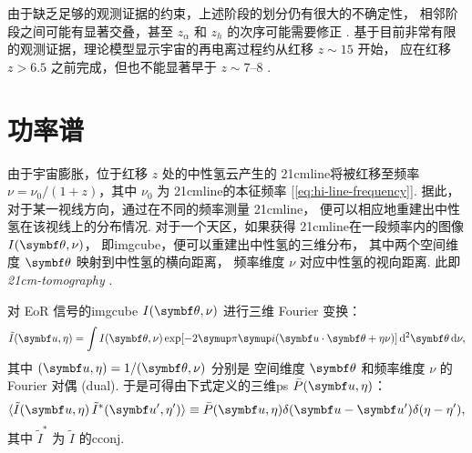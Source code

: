 由于缺乏足够的观测证据的约束，上述阶段的划分仍有很大的不确定性，
相邻阶段之间可能有显著交叠，甚至 $z_{\alpha}$ 和 $z_h$ 的次序可能需要修正
\cite{nusser2005,pritchard2012}.
基于目前非常有限的观测证据，理论模型显示宇宙的再电离过程约从红移 $z \sim 15$ 开始，
应在红移 $z > 6.5$ 之前完成，但也不能显著早于 $z \sim \numrange{7}{8}$
\cite{choudhury2006,pritchard2010mn}.

\section{功率谱}
\label{sec:ps}

由于宇宙膨胀，位于红移 $z$ 处的中性氢云产生的 \ac{21cmline}将被红移至频率
$\nu = \nu_0 / (1 + z)$，其中 $\nu_0$ 为 \ac{21cmline}的本征频率
[\autoref{eq:hi-line-frequency}].
据此，对于某一视线方向，通过在不同的频率测量 \ac{21cmline}，
便可以相应地重建出中性氢在该视线上的分布情况.
对于一个天区，如果获得 \ac{21cmline}在一段频率内的图像 $I(\B{\theta},\nu)$，
即\ac{imgcube}，便可以重建出中性氢的三维分布，
其中两个空间维度 $\B{\theta}$ 映射到中性氢的横向距离，
频率维度 $\nu$ 对应中性氢的视向距离.
此即\emph{\acf{21cm-tomography}} \cite{mellema2015}.

对 EoR 信号的\ac{imgcube} $I(\B{\theta},\nu)$ 进行三维 Fourier 变换：
\begin{equation}
  \label{eq:ft3d}
  \tilde{I}(\B{u}, \eta) =
    \int I(\B{\theta},\nu) \exp[ -2\Cpi\Ci (\B{u}\cdot\B{\theta} + \eta\nu) ]
    \,\mathrm{d}^2\B{\theta}\,\D{\nu} ,
\end{equation}
其中 $(\B{u}, \eta) = 1 / (\B{\theta}, \nu)$ 分别是
空间维度 $\B{\theta}$ 和频率维度 $\nu$ 的 Fourier 对偶 (dual).
于是可得由下式定义的三维\ac{ps} $\bar{P}(\B{u}, \eta)$：
\begin{equation}
  \label{eq:ps3d}
  \langle \tilde{I}(\B{u}, \eta) \, \tilde{I}^*(\B{u}', \eta') \rangle
    \equiv \bar{P}(\B{u}, \eta) \delta(\B{u}-\B{u}') \delta(\eta-\eta') ,
\end{equation}
其中 $\tilde{I}^*$ 为 $\tilde{I}$ 的\ac{cconj}.


